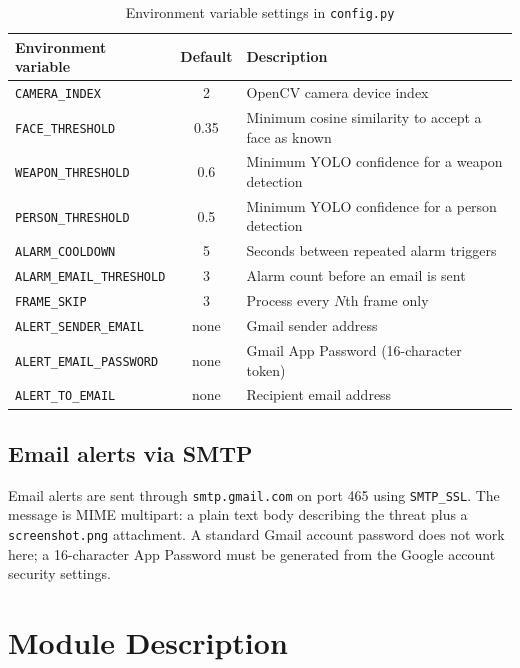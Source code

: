 \documentclass[12pt,a4paper]{report}
\begin{document}
\begin{table}[htbp]
\centering
\begin{tabular}{|l|c|p{6cm}|}
\hline
\textbf{Environment variable} & \textbf{Default} & \textbf{Description} \\
\hline
\texttt{CAMERA\_INDEX}            & 2     & OpenCV camera device index \\
\texttt{FACE\_THRESHOLD}          & 0.35  & Minimum cosine similarity to accept a face as known \\
\texttt{WEAPON\_THRESHOLD}        & 0.6   & Minimum YOLO confidence for a weapon detection \\
\texttt{PERSON\_THRESHOLD}        & 0.5   & Minimum YOLO confidence for a person detection \\
\texttt{ALARM\_COOLDOWN}          & 5     & Seconds between repeated alarm triggers \\
\texttt{ALARM\_EMAIL\_THRESHOLD}  & 3     & Alarm count before an email is sent \\
\texttt{FRAME\_SKIP}              & 3     & Process every $N$th frame only \\
\texttt{ALERT\_SENDER\_EMAIL}     & none  & Gmail sender address \\
\texttt{ALERT\_EMAIL\_PASSWORD}   & none  & Gmail App Password (16-character token) \\
\texttt{ALERT\_TO\_EMAIL}         & none  & Recipient email address \\
\hline
\end{tabular}
\caption{Environment variable settings in \texttt{config.py}}
\label{tab:config_vars}
\end{table}

\section{Email alerts via SMTP}

Email alerts are sent through \texttt{smtp.gmail.com} on port 465 using \texttt{SMTP\_SSL}. The message is MIME multipart: a plain text body describing the threat plus a \texttt{screenshot.png} attachment. A standard Gmail account password does not work here; a 16-character App Password must be generated from the Google account security settings.


\chapter{Module Description}
\end{document}
